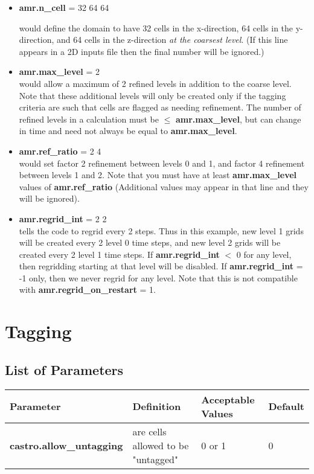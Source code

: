 \begin{itemize}

\item {\bf amr.n\_cell} = 32 64 64

would define the domain to have 32 cells in the x-direction, 64 cells in the y-direction, 
and 64 cells in the z-direction {\em{at the coarsest level}}. 
(If this line appears in a 2D inputs file then the final number will be ignored.)

\item {\bf amr.max\_level} = 2 \\ 
would allow a maximum  of 2 refined levels in addition to the coarse level.   
Note that these additional levels will only be created only if the tagging criteria 
are such that cells are flagged as needing refinement.  The number of refined levels 
in a calculation must be $\leq$ {\bf amr.max\_level}, but can change in time and need
not always be equal to {\bf amr.max\_level}.
 
\item {\bf amr.ref\_ratio} = 2 4 \\ 
would set factor 2 refinement between levels 0 and 1, and factor 4 refinement between levels 1 and 2. 
Note that you must have at least {\bf amr.max\_level} values of {\bf amr.ref\_ratio} 
(Additional values may appear in that line and they will be ignored).

\item {\bf amr.regrid\_int} = 2 2 \\
tells the code to regrid every 2 steps.  Thus in this example, new level 1 grids will be created every 2 level 0 time steps, and new level 2 grids will be created every 2 level 1 time steps. If {\bf amr.regrid\_int} $<$ 0 for any level, then regridding starting at that level will be disabled. If {\bf amr.regrid\_int} = -1 only, then we never regrid for any level. Note that this is not compatible with {\bf amr.regrid\_on\_restart} = 1.

\end{itemize}

\section{Tagging}

\subsection{List of Parameters}

\begin{table*}[h]
\begin{scriptsize}
\begin{center}
\begin{tabular}{|l|l|l|l|} \hline
Parameter & Definition & Acceptable Values &Default\\
\hline
{\bf castro.allow\_untagging} & are cells allowed to be "untagged" & 0 or 1 & 0 \\
\hline
\end{tabular}
\label{Table:Tagging}
\end{center}
\end{scriptsize}
\end{table*}

